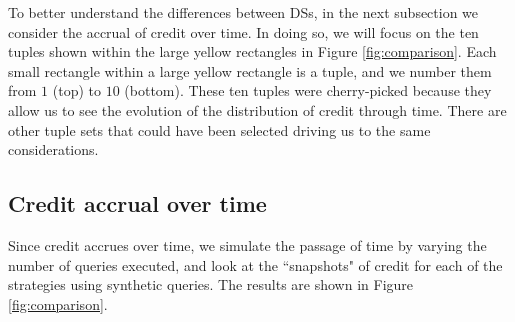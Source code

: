 \documentclass[preprint,12pt,sort&compress]{elsarticle}
\newcommand{\rone}[1]{\textcolor{reviewer1}{#1}}
\newcommand{\eat}[1]{}
\begin{document}
To better understand the differences between DSs, in the next subsection we consider the accrual of credit over time.  In doing so, we will focus on the ten tuples shown within the large yellow rectangles in Figure \ref{fig:comparison}.  Each small rectangle within a large yellow rectangle is a tuple, and we number them from $1$ (top) to $10$ (bottom). 
\rone{These ten tuples were cherry-picked because they allow us to see the evolution of the distribution of credit through time. There are other tuple sets that could have been selected driving us to the same considerations.}

\eat{
 Note that tuples 2, 7, 8, and 9 are awarded less credit than in either the lineage- or why-provenance strategies, whereas tuples 1 and 3 receives more credit than either of the other two strategies. 
 
However, the distribution does not reward tuple 2 in the same way. Also tuples 7, 8, and 9 that appear to be rewarded heavily in the why-provenance-based DS here are contain lower quantities of credit. Vice-versa, tuple 3 is much higher in credit with respect to what happens with the why-provenance-based DS.
This is due to the fact that this DS is even more sophisticated, since it uses all the information contained in the provenance polynomials. 
In this case, a tuple as 3 is able to attract even more credit than before. However, other tuples, such as 2, 7, 8, and 9 receive now less credit, since they role appears to be less determinant once the full information from the polynomials is taken into considerations. }
\eat{even more sophisticated, and can be taken into consideration when a user wants to distribute credit with a higher level of sensibility.}


\subsection{Credit accrual over time} 
Since credit accrues over time, we simulate the passage of time by varying the number of queries executed, and look at the ``snapshots" of credit for each of the strategies using synthetic queries.  The results are shown in Figure \ref{fig:comparison}.
\end{document}
